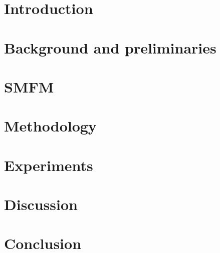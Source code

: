 \documentclass{article}
\theoremstyle{plain}
\theoremstyle{definition}
\theoremstyle{remark}
\newcommand{\ourmodel}{SMFM\xspace}
\begin{document}
\begin{abstract}

\end{abstract}

\section{Introduction}


\section{Background and preliminaries}


\section{\ourmodel}


\section{Methodology}


\section{Experiments}


\section{Discussion}


\section{Conclusion}
\label{ch:conclusion}


\FloatBarrier
\clearpage
\raggedbottom
\onecolumn



\clearpage
\onecolumn
\appendix

\end{document}
